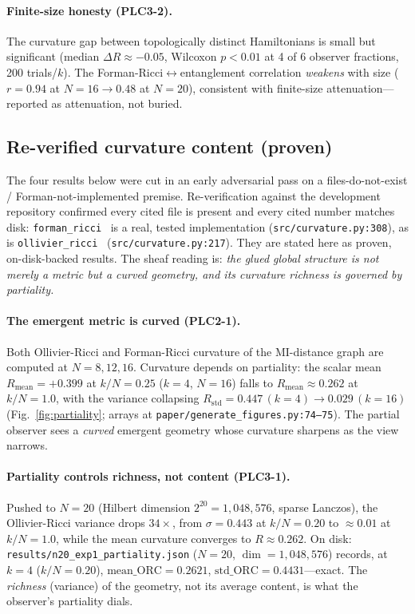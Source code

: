 \documentclass[aps,pra,twocolumn,superscriptaddress,floatfix]{revtex4-2}
\theoremstyle{definition}
\begin{document}
\paragraph{Finite-size honesty (PLC3-2).}
The curvature gap between topologically distinct Hamiltonians is small but
significant (median $\Delta R\approx-0.05$, Wilcoxon $p<0.01$ at 4 of 6 observer
fractions, 200 trials/$k$). The Forman-Ricci$\leftrightarrow$entanglement
correlation \emph{weakens} with size ($r=0.94$ at $N=16\to0.48$ at $N=20$),
consistent with finite-size attenuation---reported as attenuation, not buried.

\subsection{Re-verified curvature content (proven)}

The four results below were cut in an early adversarial pass on a
files-do-not-exist / Forman-not-implemented premise. Re-verification against the
development repository confirmed every cited file is present and every cited
number matches disk: \texttt{forman\_ricci}~\cite{forman2003} is a real, tested
implementation (\texttt{src/curvature.py:308}), as is
\texttt{ollivier\_ricci}~\cite{ollivier2009} (\texttt{src/curvature.py:217}).
They are stated here as proven, on-disk-backed results. The sheaf reading is:
\emph{the glued global structure is not merely a metric but a curved geometry,
and its curvature richness is governed by partiality.}

\paragraph{The emergent metric is curved (PLC2-1).}
Both Ollivier-Ricci and Forman-Ricci curvature of the MI-distance graph are
computed at $N=8,12,16$. Curvature depends on partiality: the scalar mean
$R_{\mathrm{mean}}=+0.399$ at $k/N=0.25$ ($k=4$, $N=16$) falls to
$R_{\mathrm{mean}}\approx0.262$ at $k/N=1.0$, with the variance collapsing
$R_{\mathrm{std}}=0.447\,(k=4)\to0.029\,(k=16)$ (Fig.~\ref{fig:partiality};
arrays at \texttt{paper/generate\_figures.py:74--75}). The partial observer sees
a \emph{curved} emergent geometry whose curvature sharpens as the view narrows.

\paragraph{Partiality controls richness, not content (PLC3-1).}
Pushed to $N=20$ (Hilbert dimension $2^{20}=1{,}048{,}576$, sparse Lanczos), the
Ollivier-Ricci variance drops $34\times$, from $\sigma=0.443$ at $k/N=0.20$ to
$\approx0.01$ at $k/N=1.0$, while the mean curvature converges to
$R\approx0.262$. On disk: \texttt{results/n20\_exp1\_partiality.json}
($N=20$, $\dim=1{,}048{,}576$) records, at $k=4$ ($k/N=0.20$),
$\mathrm{mean\_ORC}=0.2621$, $\mathrm{std\_ORC}=0.4431$---exact. The
\emph{richness} (variance) of the geometry, not its average content, is what the
observer's partiality dials.
\end{document}

